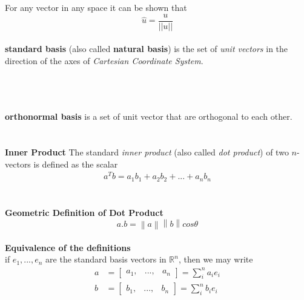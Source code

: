 \documentclass[a4paper, 12pt]{article}
\newcommand{\norm}[1]{\left\lVert#1\right\rVert}
\begin{document}
\\
\\
For any vector in any space it can be shown that
\[
\hat{u} = \frac{u}{||u||}
\]
\\
\textbf{standard basis} (also called \textbf{natural basis}) is the set of \textit{unit vectors} in the direction of the axes of \textit{Cartesian Coordinate System}.
\\
\\
\\
\\
\textbf{orthonormal basis} is a set of unit vector that are orthogonal to each other.
\\
\\
\\
\textbf{Inner Product}
The standard \textit{inner product} (also called \textit{dot product}) of 
two $n$-vectors is defined as the scalar
\begin{align*}
a^Tb = a_1b_1 + a_2b_2 + ... + a_nb_n
\end{align*}
\\
\\
\textbf{Geometric Definition of Dot Product}
\begin{equation}
a.b = \norm{a} \norm{b} cos\theta
\end{equation}
\\
\textbf{Equivalence of the definitions}
\\
if $e_1, ..., e_n$ are the standard basis vectors in $\mathbb{R}^n$, then we may write
\begin{align*}
a &= \left[{
\begin{array}{ccc}
a_1,&...,&a_n
\end{array}
}\right]
= \sum\limits_{i}^{n} a_ie_i
\\
b &= \left[{
\begin{array}{ccc}
b_1,&...,&b_n
\end{array}
}\right]
= \sum\limits_{i}^{n} b_ie_i 
\end{align*}
\end{document}
